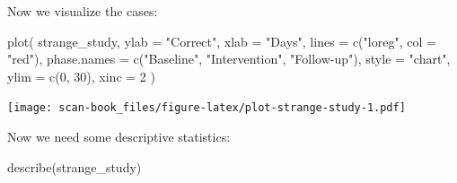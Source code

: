 \documentclass[
]{book}
\newenvironment{Shaded}{\begin{snugshade}}{\end{snugshade}}
\newcommand{\AttributeTok}[1]{\textcolor[rgb]{0.77,0.63,0.00}{#1}}
\newcommand{\DecValTok}[1]{\textcolor[rgb]{0.00,0.00,0.81}{#1}}
\newcommand{\FunctionTok}[1]{\textcolor[rgb]{0.00,0.00,0.00}{#1}}
\newcommand{\NormalTok}[1]{#1}
\newcommand{\StringTok}[1]{\textcolor[rgb]{0.31,0.60,0.02}{#1}}
\begin{document}
Now we visualize the cases:

\begin{Shaded}
\begin{Highlighting}[]
\FunctionTok{plot}\NormalTok{(}
\NormalTok{  strange\_study,}
  \AttributeTok{ylab =} \StringTok{"Correct"}\NormalTok{,}
  \AttributeTok{xlab =} \StringTok{"Days"}\NormalTok{,}
  \AttributeTok{lines =} \FunctionTok{c}\NormalTok{(}\StringTok{"loreg"}\NormalTok{, }\AttributeTok{col =} \StringTok{"red"}\NormalTok{),}
  \AttributeTok{phase.names =} \FunctionTok{c}\NormalTok{(}\StringTok{"Baseline"}\NormalTok{, }\StringTok{"Intervention"}\NormalTok{, }\StringTok{"Follow{-}up"}\NormalTok{),}
  \AttributeTok{style =} \StringTok{"chart"}\NormalTok{,}
  \AttributeTok{ylim =} \FunctionTok{c}\NormalTok{(}\DecValTok{0}\NormalTok{, }\DecValTok{30}\NormalTok{),}
  \AttributeTok{xinc =} \DecValTok{2}
\NormalTok{)}
\end{Highlighting}
\end{Shaded}

\texttt{[image: scan-book\_files/figure-latex/plot-strange-study-1.pdf]}

Now we need some descriptive statistics:

\begin{Shaded}
\begin{Highlighting}[]
\FunctionTok{describe}\NormalTok{(strange\_study)}
\end{Highlighting}
\end{Shaded}
\end{document}
